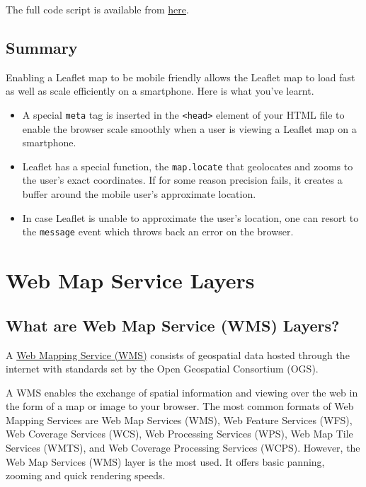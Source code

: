 \documentclass[
]{book}
\begin{document}
The full code script is available from \href{https://github.com/sammigachuhi/my-leaflet-project/tree/main/my-leaflet-code/chapter-11-mobile-friendly-webapps}{here}.

\hypertarget{summary-9}{%
\section{Summary}\label{summary-9}}

Enabling a Leaflet map to be mobile friendly allows the Leaflet map to load fast as well as scale efficiently on a smartphone. Here is what you've learnt.

\begin{itemize}
\item
  A special \texttt{meta} tag is inserted in the \texttt{\textless{}head\textgreater{}} element of your HTML file to enable the browser scale smoothly when a user is viewing a Leaflet map on a smartphone.
\item
  Leaflet has a special function, the \texttt{map.locate} that geolocates and zooms to the user's exact coordinates. If for some reason precision fails, it creates a buffer around the mobile user's approximate location.
\item
  In case Leaflet is unable to approximate the user's location, one can resort to the \texttt{message} event which throws back an error on the browser.
\end{itemize}

\hypertarget{web-map-service-layers}{%
\chapter{Web Map Service Layers}\label{web-map-service-layers}}

\hypertarget{what-are-web-map-service-wms-layers}{%
\section{What are Web Map Service (WMS) Layers?}\label{what-are-web-map-service-wms-layers}}

A \href{https://gisgeography.com/web-mapping-services-wms/}{Web Mapping Service (WMS)} consists of geospatial data hosted through the internet with standards set by the Open Geospatial Consortium (OGS).

A WMS enables the exchange of spatial information and viewing over the web in the form of a map or image to your browser. The most common formats of Web Mapping Services are Web Map Services (WMS), Web Feature Services (WFS), Web Coverage Services (WCS), Web Processing Services (WPS), Web Map Tile Services (WMTS), and Web Coverage Processing Services (WCPS). However, the Web Map Services (WMS) layer is the most used. It offers basic panning, zooming and quick rendering speeds.
\end{document}
